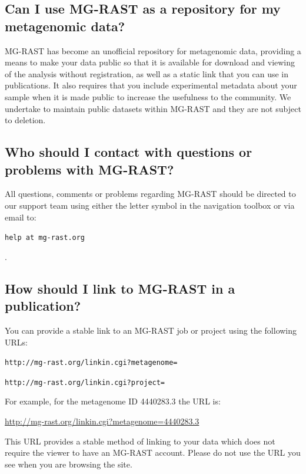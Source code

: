 \documentclass[12pt,fullpage]{report}
\begin{document}
\subsection*{Can I use MG-RAST as a repository for my metagenomic data?}
MG-RAST has become an unofficial repository for metagenomic data, providing a means to make your data public so that it is available for download and viewing of the analysis without registration, as well as a static link that you can use in publications. It also requires that you include experimental metadata about your sample when it is made public to increase the usefulness to the community. We undertake to maintain public datasets within MG-RAST and they are not subject to deletion.
\subsection*{Who should I contact with questions or problems with MG-RAST?}
All questions, comments or problems regarding MG-RAST should be directed to our support team using either the letter symbol in the navigation toolbox or via email to: \begin{small}\texttt{help at mg-rast.org}\end{small}.
\subsection*{How should I link to MG-RAST in a publication?}
You can provide a stable link to an MG-RAST job or project using the following URLs:

\begin{small}\texttt{http://mg-rast.org/linkin.cgi?metagenome=}\end{small}

\begin{small}\texttt{http://mg-rast.org/linkin.cgi?project=}\end{small}

\noindent
For example, for the metagenome ID 4440283.3 the URL is:

\begin{small}\url{http://mg-rast.org/linkin.cgi?metagenome=4440283.3}\end{small}

\noindent
This URL provides a stable method of linking to your data which does not require the viewer to have an MG-RAST account. Please do not use the URL you see when you are browsing the site.
\end{document}
